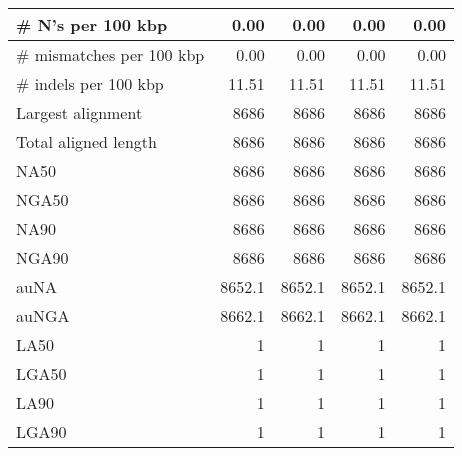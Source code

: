 \documentclass[12pt,a4paper]{article}
\begin{document}
\begin{table}[ht]
\begin{center}
\begin{tabular}{|l*{4}{|r}|}
\# N's per 100 kbp & 0.00 & 0.00 & 0.00 & 0.00 \\ \hline
\# mismatches per 100 kbp & 0.00 & 0.00 & 0.00 & 0.00 \\ \hline
\# indels per 100 kbp & 11.51 & 11.51 & 11.51 & 11.51 \\ \hline
Largest alignment & 8686 & 8686 & 8686 & 8686 \\ \hline
Total aligned length & 8686 & 8686 & 8686 & 8686 \\ \hline
NA50 & 8686 & 8686 & 8686 & 8686 \\ \hline
NGA50 & 8686 & 8686 & 8686 & 8686 \\ \hline
NA90 & 8686 & 8686 & 8686 & 8686 \\ \hline
NGA90 & 8686 & 8686 & 8686 & 8686 \\ \hline
auNA & 8652.1 & 8652.1 & 8652.1 & 8652.1 \\ \hline
auNGA & 8662.1 & 8662.1 & 8662.1 & 8662.1 \\ \hline
LA50 & 1 & 1 & 1 & 1 \\ \hline
LGA50 & 1 & 1 & 1 & 1 \\ \hline
LA90 & 1 & 1 & 1 & 1 \\ \hline
LGA90 & 1 & 1 & 1 & 1 \\ \hline
\end{tabular}
\end{center}
\end{table}
\end{document}
